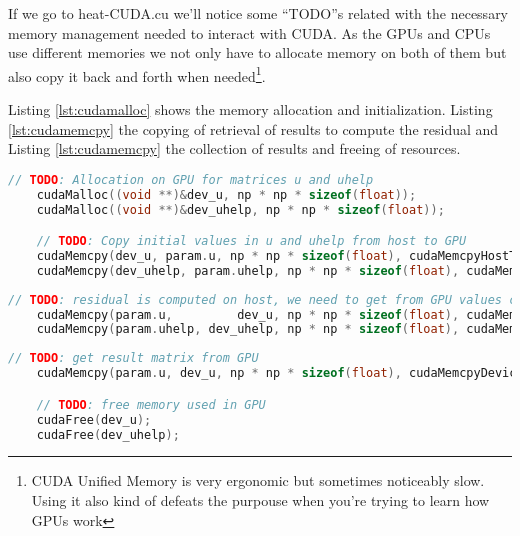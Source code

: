 \documentclass[a4paper, 10pt]{article}
\begin{document}
If we go to heat-CUDA.cu we'll notice some ``TODO''s related with the necessary memory management needed to interact with CUDA. As the GPUs and CPUs use different memories we not only have to allocate memory on both of them but also copy it back and forth when needed\footnote{CUDA Unified Memory is very ergonomic but sometimes noticeably slow. Using it also kind of defeats the purpouse when you're trying to learn how GPUs work}.


Listing \ref{lst:cudamalloc} shows the memory allocation and initialization. Listing \ref{lst:cudamemcpy} the copying of
retrieval of results to compute the residual and Listing \ref{lst:cudamemcpy} the collection of results and freeing 
of resources.
\begin{lstlisting}[language=c, caption={Memory allocation and initialization}, label={lst:cudamalloc}]
    // TODO: Allocation on GPU for matrices u and uhelp
    cudaMalloc((void **)&dev_u, np * np * sizeof(float));
    cudaMalloc((void **)&dev_uhelp, np * np * sizeof(float));

    // TODO: Copy initial values in u and uhelp from host to GPU
    cudaMemcpy(dev_u, param.u, np * np * sizeof(float), cudaMemcpyHostToDevice);
    cudaMemcpy(dev_uhelp, param.uhelp, np * np * sizeof(float), cudaMemcpyHostToDevice);
\end{lstlisting}

\begin{lstlisting}[language=c, caption={Memory copying}, label={lst:cudamemcpy}]
    // TODO: residual is computed on host, we need to get from GPU values computed in u and uhelp
    cudaMemcpy(param.u,         dev_u, np * np * sizeof(float), cudaMemcpyDeviceToHost);
    cudaMemcpy(param.uhelp, dev_uhelp, np * np * sizeof(float), cudaMemcpyDeviceToHost);
\end{lstlisting}

\begin{lstlisting}[language=c, caption={Memory freeing and result retrieval}, label={lst:cudamemfree}]
    // TODO: get result matrix from GPU
    cudaMemcpy(param.u, dev_u, np * np * sizeof(float), cudaMemcpyDeviceToHost);

    // TODO: free memory used in GPU
    cudaFree(dev_u);
    cudaFree(dev_uhelp);
\end{lstlisting}
\end{document}
